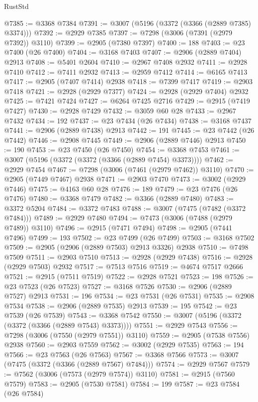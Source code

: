 \begin{lexlean}{RustStd}
\begin{coremodule}
{\begin{coremodule}
{{{{{{{{{{{{{{{{{{{{{{{{{{{{{{{{{{{{{{{{{{{{{{{{{{{{{{{{{{{{{{{{{{{{{{{{{{{{{{@7385 := @3368 @7384
@7391 := @3007 (@5196 (@3372 (@3366 (@2889 @7385) @3374)))
@7392 := @2929 @7385
@7397 := @7298 (@3006 (@7391 (@2979 @7392)) @3110)
@7399 := @2905 (@7380 @7397)
@7400 := 188
@7403 := @23 @7400 (@26 @7400)
@7404 := @3168 @7403
@7407 := @2906 (@2889 @7404) @2913
@7408 := @5401 @2604
@7410 := @2967 @7408 @2932
@7411 := @2928 @7410
@7412 := @7411 @2932
@7413 := @2959 @7412
@7414 := @6165 @7413
@7417 := @2905 (@7407 @7414) @2938
@7418 := @7399 @7417
@7419 := @2903 @7418
@7421 := @2928 (@2929 @7377)
@7424 := @2928 (@2929 @7404) @2932
@7425 := @7421 @7424
@7427 := @6264 @7425 @2716
@7429 := @2915 (@7419 @7427)
@7430 := @2928 @7429
@7432 := @3059 @60 @28
@7433 := @2967 @7432
@7434 := 192
@7437 := @23 @7434 (@26 @7434)
@7438 := @3168 @7437
@7441 := @2906 (@2889 @7438) @2913
@7442 := 191
@7445 := @23 @7442 (@26 @7442)
@7446 := @2908 @7445
@7449 := @2906 (@2889 @7446) @2913
@7450 := 190
@7453 := @23 @7450 (@26 @7450)
@7454 := @3368 @7453
@7461 := @3007 (@5196 (@3372 (@3372 (@3366 (@2889 @7454) @3373))))
@7462 := @2929 @7454
@7467 := @7298 (@3006 (@7461 (@2979 @7462)) @3110)
@7470 := @2905 (@7449 @7467) @2938
@7471 := @2903 @7470
@7473 := @3002 (@2929 @7446)
@7475 := @4163 @60 @28
@7476 := 189
@7479 := @23 @7476 (@26 @7476)
@7480 := @3368 @7479
@7482 := @3366 (@2889 @7480)
@7483 := @3372 @5204
@7484 := @3372 @7483
@7488 := @3007 (@7475 (@7482 (@3372 @7484)))
@7489 := @2929 @7480
@7494 := @7473 (@3006 (@7488 (@2979 @7489)) @3110)
@7496 := @2915 (@7471 @7494)
@7498 := @2905 (@7441 @7496)
@7499 := 193
@7502 := @23 @7499 (@26 @7499)
@7503 := @3168 @7502
@7509 := @2905 (@2906 (@2889 @7503) @2913 @3326) @2938
@7510 := @7498 @7509
@7511 := @2903 @7510
@7513 := @2928 (@2929 @7438)
@7516 := @2928 (@2929 @7503) @2932
@7517 := @7513 @7516
@7519 := @4674 @7517 @2666
@7521 := @2915 (@7511 @7519)
@7522 := @2928 @7521
@7523 := 198
@7526 := @23 @7523 (@26 @7523)
@7527 := @3168 @7526
@7530 := @2906 (@2889 @7527) @2913
@7531 := 196
@7534 := @23 @7531 (@26 @7531)
@7535 := @2908 @7534
@7538 := @2906 (@2889 @7535) @2913
@7539 := 195
@7542 := @23 @7539 (@26 @7539)
@7543 := @3368 @7542
@7550 := @3007 (@5196 (@3372 (@3372 (@3366 (@2889 @7543) @3373))))
@7551 := @2929 @7543
@7556 := @7298 (@3006 (@7550 (@2979 @7551)) @3110)
@7559 := @2905 (@7538 @7556) @2938
@7560 := @2903 @7559
@7562 := @3002 (@2929 @7535)
@7563 := 194
@7566 := @23 @7563 (@26 @7563)
@7567 := @3368 @7566
@7573 := @3007 (@7475 (@3372 (@3366 (@2889 @7567) @7484)))
@7574 := @2929 @7567
@7579 := @7562 (@3006 (@7573 (@2979 @7574)) @3110)
@7581 := @2915 (@7560 @7579)
@7583 := @2905 (@7530 @7581)
@7584 := 199
@7587 := @23 @7584 (@26 @7584)
}}}}}}}}}}}}}}}}}}}}}}}}}}}}}}}}}}}}}}}}}}}}}}}}}}}}}}}}}}}}}}}}}}}}}}}}}}}}}}
\end{coremodule}}
\end{coremodule}
\end{lexlean}
